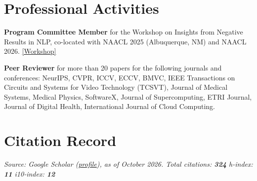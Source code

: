 \documentclass[letterpaper,11pt]{article}
\begin{document}

\section{Professional Activities}
\begin{enumerate}[leftmargin=1cm, label={[\arabic*]}, itemsep=3pt]
  \small
  \item \textbf{Program Committee Member} for the Workshop on Insights from Negative Results in NLP, co-located with NAACL 2025 (Albuquerque, NM) and NAACL 2026. \href{https://insights-workshop.github.io/2025/pc/}{[Workshop]}
  
  \item \textbf{Peer Reviewer} for more than 20 papers for the following journals and conferences: NeurIPS, CVPR, ICCV, ECCV, BMVC, IEEE Transactions on Circuits and Systems for Video Technology (TCSVT), Journal of Medical Systems, Medical Physics, SoftwareX, Journal of Supercomputing, ETRI Journal, Journal of Digital Health, International Journal of Cloud Computing.
\end{enumerate}

\section{Citation Record}

\noindent\small\textit{Source: Google Scholar (\href{https://scholar.google.com/citations?user=4JbL29YAAAAJ}{profile}), as of October 2026. \quad Total citations: \textbf{324} \quad h-index: \textbf{11} \quad i10-index: \textbf{12}}
\vspace{0pt}
\end{document}
